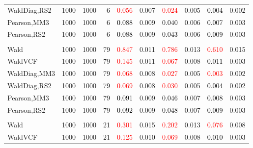 \documentclass[
]{article}
\begin{document}
\begin{table}[H]
{\begin{tabular}[t]{lrrrrrrlrr}
\hspace{1em}WaldDiag,RS2 & 1000 & 1000 & 6 & \textcolor{red}{0.056} & 0.007 & \textcolor{red}{0.024} & 0.005 & \textcolor{black}{0.004} & 0.002\\
\hspace{1em}Pearson,MM3 & 1000 & 1000 & 6 & \textcolor{black}{0.088} & 0.009 & \textcolor{black}{0.040} & 0.006 & \textcolor{black}{0.007} & 0.003\\
\hspace{1em}Pearson,RS2 & 1000 & 1000 & 6 & \textcolor{black}{0.088} & 0.009 & \textcolor{black}{0.043} & 0.006 & \textcolor{black}{0.009} & 0.003\\
\addlinespace[0.3em]
\multicolumn{10}{l}{\textbf{1F 15V}}\\
\hspace{1em}Wald & 1000 & 1000 & 79 & \textcolor{red}{0.847} & 0.011 & \textcolor{red}{0.786} & 0.013 & \textcolor{red}{0.610} & 0.015\\
\hspace{1em}WaldVCF & 1000 & 1000 & 79 & \textcolor{red}{0.145} & 0.011 & \textcolor{red}{0.067} & 0.008 & \textcolor{black}{0.011} & 0.003\\
\hspace{1em}WaldDiag,MM3 & 1000 & 1000 & 79 & \textcolor{red}{0.068} & 0.008 & \textcolor{red}{0.027} & 0.005 & \textcolor{red}{0.003} & 0.002\\
\hspace{1em}WaldDiag,RS2 & 1000 & 1000 & 79 & \textcolor{red}{0.069} & 0.008 & \textcolor{red}{0.030} & 0.005 & \textcolor{black}{0.004} & 0.002\\
\hspace{1em}Pearson,MM3 & 1000 & 1000 & 79 & \textcolor{black}{0.091} & 0.009 & \textcolor{black}{0.046} & 0.007 & \textcolor{black}{0.008} & 0.003\\
\hspace{1em}Pearson,RS2 & 1000 & 1000 & 79 & \textcolor{black}{0.092} & 0.009 & \textcolor{black}{0.048} & 0.007 & \textcolor{black}{0.009} & 0.003\\
\addlinespace[0.3em]
\multicolumn{10}{l}{\textbf{2F 10V}}\\
\hspace{1em}Wald & 1000 & 1000 & 21 & \textcolor{red}{0.301} & 0.015 & \textcolor{red}{0.202} & 0.013 & \textcolor{red}{0.076} & 0.008\\
\hspace{1em}WaldVCF & 1000 & 1000 & 21 & \textcolor{red}{0.125} & 0.010 & \textcolor{red}{0.069} & 0.008 & \textcolor{black}{0.010} & 0.003\\

\end{tabular}}
\end{table}
\end{document}
